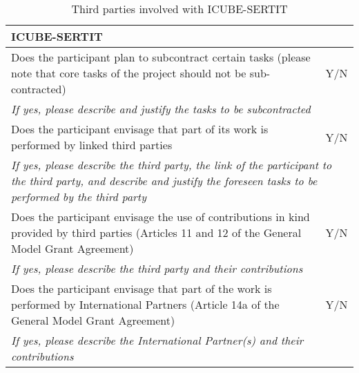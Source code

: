 \begin{table}[H]
	\centering
	\begin{tabular}{|p{10cm}|p{4cm}|}
		\hline
		
		\multicolumn{2}{|p{14cm}|}{\textbf{ICUBE-SERTIT}}\\
		
		\hline
		
		Does the participant plan to subcontract certain tasks (please note that core tasks of the project should not be sub-contracted) & Y/N\\
		
		\hline
		
		\multicolumn{2}{|p{14cm}|}{\textit{If yes, please describe and justify the tasks to be subcontracted}}\\
		
		\hline
		
		Does the participant envisage that part of its work is performed by linked third parties & Y/N\\
		
		\hline
		
		\multicolumn{2}{|p{14cm}|}{\textit{If yes, please describe the third party, the link of the participant to the third party, and describe and justify the foreseen tasks to be performed by the third party}}\\
		
		\hline
		
		Does the participant envisage the use of contributions in kind provided by third parties (Articles 11 and 12 of the General Model Grant Agreement) & Y/N\\
		
		\hline
		
		\multicolumn{2}{|p{14cm}|}{\textit{If yes, please describe the third party and their contributions}}\\
		
		\hline
		
		Does the participant envisage that part of the work is performed by International Partners (Article 14a of the General Model Grant Agreement) & Y/N\\
		
		\hline
		
		\multicolumn{2}{|p{14cm}|}{\textit{If yes, please describe the International Partner(s) and their contributions}}\\
		
		\hline
	\end{tabular}
	\caption{Third parties involved with ICUBE-SERTIT}
\end{table}



